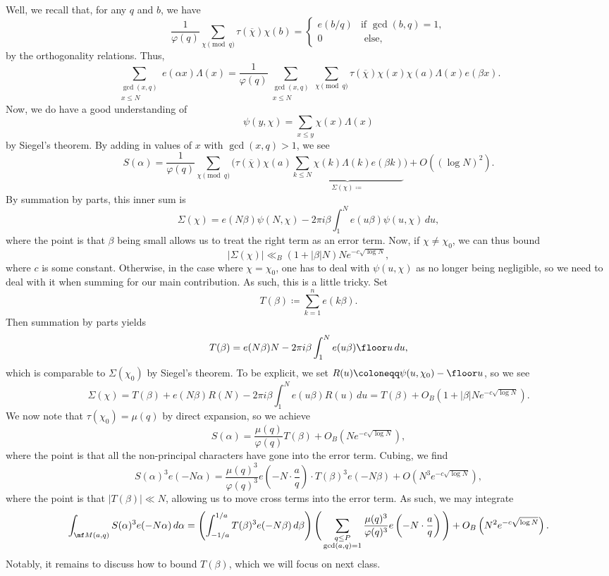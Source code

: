 \documentclass[../notes.tex]{subfiles}
\begin{document}
Well, we recall that, for any $q$ and $b$, we have
\[\frac1{\varphi(q)}\sum_{\chi\pmod q}\tau(\overline\chi)\chi(b)=\begin{cases}
	e(b/q) & \text{if }\gcd(b,q)=1, \\
	0 & \text{ else},
\end{cases}\]
by the orthogonality relations. Thus,
\[\sum_{\substack{\gcd(x,q)\\x\le N}}e(\alpha x)\Lambda(x)=\frac1{\varphi(q)}\sum_{\substack{\gcd(x,q)\\x\le N}}\sum_{\chi\pmod q}\tau(\overline\chi)\chi(x)\chi(a)\Lambda(x)e(\beta x).\]
Now, we do have a good understanding of
\[\psi(y,\chi)=\sum_{x\le y}\chi(x)\Lambda(x)\]
by Siegel's theorem. By adding in values of $x$ with $\gcd(x,q)>1$, we see
\[S(\alpha)=\frac1{\varphi(q)}\sum_{\chi\pmod q}\Bigg(\tau(\overline\chi)\chi(a)\underbrace{\sum_{k\le N}\chi(k)\Lambda(k)e(\beta k)}_{\Sigma(\chi)\coloneqq}\Bigg)+O\left((\log N)^2\right).\]
By summation by parts, this inner sum is
\[\Sigma(\chi)=e(N\beta)\psi(N,\chi)-2\pi i\beta\int_1^Ne(u\beta)\psi(u,\chi)\,du,\]
where the point is that $\beta$ being small allows us to treat the right term as an error term. Now, if $\chi\ne\chi_0$, we can thus bound
\[|\Sigma(\chi)|\ll_B\left(1+|\beta|N\right)Ne^{-c\sqrt{\log N}},\]
where $c$ is some constant. Otherwise, in the case where $\chi=\chi_0$, one has to deal with $\psi(u,\chi)$ as no longer being negligible, so we need to deal with it when summing for our main contribution. As such, this is a little tricky. Set
\[T(\beta)\coloneqq\sum_{k=1}^ne(k\beta).\]
Then summation by parts yields
\[T(\beta)=e(N\beta)N-2\pi i\beta\int_1^Ne(u\beta)\floor u\,du,\]
which is comparable to $\Sigma(\chi_0)$ by Siegel's theorem. To be explicit, we set $R(u)\coloneqq\psi(u,\chi_0)-\floor u$, so we see
\[\Sigma(\chi)=T(\beta)+e(N\beta)R(N)-2\pi i\beta\int_1^Ne(u\beta)R(u)\,du=T(\beta)+O_B\left(1+|\beta|Ne^{-c\sqrt{\log N}}\right).\]
We now note that $\tau(\chi_0)=\mu(q)$ by direct expansion, so we achieve
\[S(\alpha)=\frac{\mu(q)}{\varphi(q)}T(\beta)+O_B\left(Ne^{-c\sqrt{\log N}}\right),\]
where the point is that all the non-principal characters have gone into the error term. Cubing, we find
\[S(\alpha)^3e(-N\alpha)=\frac{\mu(q)^3}{\varphi(q)^3}e\left(-N\cdot\frac aq\right)\cdot T(\beta)^3e(-N\beta)+O\left(N^3e^{-c\sqrt{\log N}}\right),\]
where the point is that $|T(\beta)|\ll N$, allowing us to move cross terms into the error term. As such, we may integrate
\[\int_{\mf M(a,q)}S(\alpha)^3e(-N\alpha)\,d\alpha=\left(\int_{-1/a}^{1/a}T(\beta)^3e(-N\beta)\,d\beta\right)\Bigg(\sum_{\substack{q\le P\\\gcd(a,q)=1}}\frac{\mu(q)^3}{\varphi(q)^3}e\left(-N\cdot\frac aq\right)\Bigg)+O_B\left(N^2e^{-c\sqrt{\log N}}\right).\]
Notably, it remains to discuss how to bound $T(\beta)$, which we will focus on next class.
\end{document}
